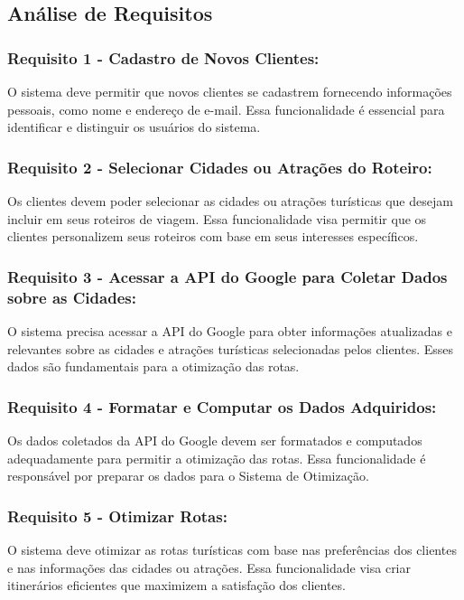 \subsection{Análise de Requisitos}


\subsubsection{Requisito 1 - Cadastro de Novos Clientes:} O sistema deve permitir que novos clientes se cadastrem fornecendo informações pessoais, como nome e endereço de e-mail. Essa funcionalidade é essencial para identificar e distinguir os usuários do sistema.

\subsubsection{Requisito 2 - Selecionar Cidades ou Atrações do Roteiro:} Os clientes devem poder selecionar as cidades ou atrações turísticas que desejam incluir em seus roteiros de viagem. Essa funcionalidade visa permitir que os clientes personalizem seus roteiros com base em seus interesses específicos.

\subsubsection{Requisito 3 - Acessar a API do Google para Coletar Dados sobre as Cidades:} O sistema precisa acessar a API do Google para obter informações atualizadas e relevantes sobre as cidades e atrações turísticas selecionadas pelos clientes. Esses dados são fundamentais para a otimização das rotas.

\subsubsection{Requisito 4 - Formatar e Computar os Dados Adquiridos:} Os dados coletados da API do Google devem ser formatados e computados adequadamente para permitir a otimização das rotas. Essa funcionalidade é responsável por preparar os dados para o Sistema de Otimização.

\subsubsection{Requisito 5 - Otimizar Rotas:} O sistema deve otimizar as rotas turísticas com base nas preferências dos clientes e nas informações das cidades ou atrações. Essa funcionalidade visa criar itinerários eficientes que maximizem a satisfação dos clientes.

